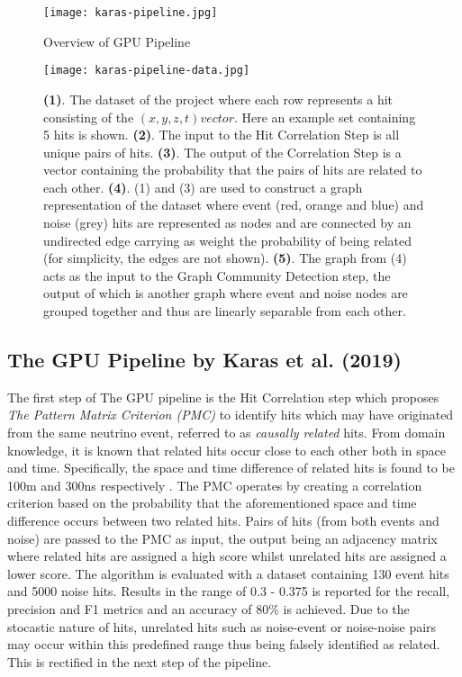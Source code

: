 \begin{figure}[h]
  \centering
  \texttt{[image: karas-pipeline.jpg]}
  \caption{Overview of GPU Pipeline}
  \label{fig:karas-pipeline}
\end{figure}

\begin{figure}[h]
  \centering
  \texttt{[image: karas-pipeline-data.jpg]}
  \caption{\textbf{(1)}. The dataset of the project where each row
    represents a hit consisting of the $(x, y, z, t) vector$. Here an
    example set containing 5 hits is shown. \textbf{(2)}. The input to
    the Hit Correlation Step is all unique pairs of hits.
    \textbf{(3)}. The output of the Correlation Step is a vector
    containing the probability that the pairs of hits are related to
    each other. \textbf{(4)}. (1) and (3) are used to construct a
    graph representation of the dataset where event (red, orange and
    blue) and noise (grey) hits are represented as nodes and are
    connected by an undirected edge carrying as weight the probability
    of being related (for simplicity, the edges are not shown).
    \textbf{(5)}. The graph from (4) acts as the input to the Graph
    Community Detection step, the output of which is another graph
    where event and noise nodes are grouped together and thus are
    linearly separable from each other.}
  \label{fig:karas-pipeline-data}
\end{figure}

\subsection{The GPU Pipeline by Karas et al. (2019)}
\label{sec:gpu-pipeline}
The first step of The GPU pipeline is the Hit Correlation step which
proposes \emph{The Pattern Matrix Criterion (PMC)} to identify hits
which may have originated from the same neutrino event, referred to as
\emph{causally related} hits. From domain knowledge, it is known that
related hits occur close to each other both in space and time.
Specifically, the space and time difference of related hits is found
to be 100m and 300ns respectively \cite{adrian2016letter}. The PMC
operates by creating a correlation criterion based on the probability
that the aforementioned space and time difference occurs between two
related hits. Pairs of hits (from both events and noise) are passed to
the PMC as input, the output being an adjacency matrix where related
hits are assigned a high score whilst unrelated hits are assigned a
lower score. The algorithm is evaluated with a dataset containing 130
event hits and 5000 noise hits. Results in the range of 0.3 - 0.375
is reported for the recall, precision and F1 metrics and an accuracy
of 80\% is achieved. Due to the stocastic nature of hits, unrelated
hits such as noise-event or noise-noise pairs may occur within this
predefined range thus being falsely identified as related. This is
rectified in the next step of the pipeline.


